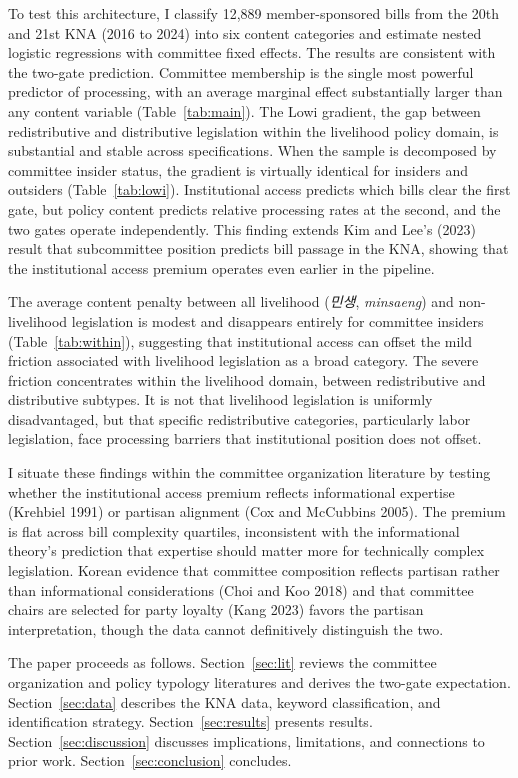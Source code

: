 \documentclass[11pt]{article}
\begin{document}
To test this architecture, I classify 12,889 member-sponsored bills from the 20th and 21st KNA (2016 to 2024) into six content categories and estimate nested logistic regressions with committee fixed effects. The results are consistent with the two-gate prediction. Committee membership is the single most powerful predictor of processing, with an average marginal effect substantially larger than any content variable (Table~\ref{tab:main}). The Lowi gradient, the gap between redistributive and distributive legislation within the livelihood policy domain, is substantial and stable across specifications. When the sample is decomposed by committee insider status, the gradient is virtually identical for insiders and outsiders (Table~\ref{tab:lowi}). Institutional access predicts which bills clear the first gate, but policy content predicts relative processing rates at the second, and the two gates operate independently. This finding extends Kim and Lee's (2023) result that subcommittee position predicts bill passage in the KNA, showing that the institutional access premium operates even earlier in the pipeline.

The average content penalty between all livelihood (\emph{민생}, \emph{minsaeng}) and non-livelihood legislation is modest and disappears entirely for committee insiders (Table~\ref{tab:within}), suggesting that institutional access can offset the mild friction associated with livelihood legislation as a broad category. The severe friction concentrates within the livelihood domain, between redistributive and distributive subtypes. It is not that livelihood legislation is uniformly disadvantaged, but that specific redistributive categories, particularly labor legislation, face processing barriers that institutional position does not offset.

I situate these findings within the committee organization literature by testing whether the institutional access premium reflects informational expertise (Krehbiel 1991) or partisan alignment (Cox and McCubbins 2005). The premium is flat across bill complexity quartiles, inconsistent with the informational theory's prediction that expertise should matter more for technically complex legislation. Korean evidence that committee composition reflects partisan rather than informational considerations (Choi and Koo 2018) and that committee chairs are selected for party loyalty (Kang 2023) favors the partisan interpretation, though the data cannot definitively distinguish the two.

The paper proceeds as follows. Section~\ref{sec:lit} reviews the committee organization and policy typology literatures and derives the two-gate expectation. Section~\ref{sec:data} describes the KNA data, keyword classification, and identification strategy. Section~\ref{sec:results} presents results. Section~\ref{sec:discussion} discusses implications, limitations, and connections to prior work. Section~\ref{sec:conclusion} concludes.
\end{document}
